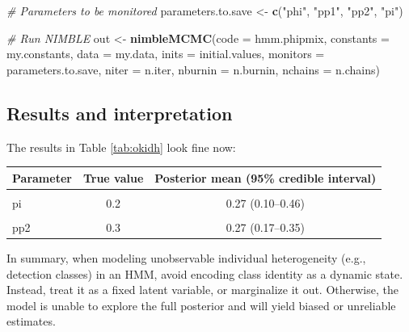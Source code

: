 \documentclass[
  12pt,
]{krantz}
\newenvironment{Shaded}{\begin{snugshade}}{\end{snugshade}}
\newcommand{\AttributeTok}[1]{\textcolor[rgb]{0.13,0.29,0.53}{#1}}
\newcommand{\CommentTok}[1]{\textcolor[rgb]{0.56,0.35,0.01}{\textit{#1}}}
\newcommand{\FunctionTok}[1]{\textcolor[rgb]{0.13,0.29,0.53}{\textbf{#1}}}
\newcommand{\NormalTok}[1]{#1}
\newcommand{\OtherTok}[1]{\textcolor[rgb]{0.56,0.35,0.01}{#1}}
\newcommand{\StringTok}[1]{\textcolor[rgb]{0.31,0.60,0.02}{#1}}
\begin{document}
\begin{Shaded}
\begin{Highlighting}[]
\CommentTok{\# Parameters to be monitored}
\NormalTok{parameters.to.save }\OtherTok{\textless{}{-}} \FunctionTok{c}\NormalTok{(}\StringTok{"phi"}\NormalTok{, }\StringTok{"pp1"}\NormalTok{, }\StringTok{"pp2"}\NormalTok{, }\StringTok{"pi"}\NormalTok{)}

\CommentTok{\# Run NIMBLE}
\NormalTok{out }\OtherTok{\textless{}{-}} \FunctionTok{nimbleMCMC}\NormalTok{(}\AttributeTok{code =}\NormalTok{ hmm.phipmix, }
                  \AttributeTok{constants =}\NormalTok{ my.constants,}
                  \AttributeTok{data =}\NormalTok{ my.data,              }
                  \AttributeTok{inits =}\NormalTok{ initial.values,}
                  \AttributeTok{monitors =}\NormalTok{ parameters.to.save,}
                  \AttributeTok{niter =}\NormalTok{ n.iter,}
                  \AttributeTok{nburnin =}\NormalTok{ n.burnin, }
                  \AttributeTok{nchains =}\NormalTok{ n.chains)}
\end{Highlighting}
\end{Shaded}

\subsection{Results and interpretation}\label{results-and-interpretation-5}

The results in Table \ref{tab:okidh} look fine now:

\begin{table}
\centering
\caption{\label{tab:okidh}Posterior estimates vs. data-generating values for a finite--mixture HMM, when a marginalized likelihood is used.}
\centering
\begin{longtable}{lcc}
\toprule
Parameter & True value & Posterior mean (95\% credible interval)\\
\midrule
\cellcolor{gray!10}{phi} & \cellcolor{gray!10}{0.7} & \cellcolor{gray!10}{0.72 (0.69–0.75)}\\
pi & 0.2 & 0.27 (0.10–0.46)\\
\cellcolor{gray!10}{pp1} & \cellcolor{gray!10}{0.8} & \cellcolor{gray!10}{0.79 (0.65–0.93)}\\
pp2 & 0.3 & 0.27 (0.17–0.35)\\
\bottomrule
\end{longtable}
\end{table}

\justifying

In summary, when modeling unobservable individual heterogeneity (e.g., detection classes) in an HMM, avoid encoding class identity as a dynamic state. Instead, treat it as a fixed latent variable, or marginalize it out. Otherwise, the model is unable to explore the full posterior and will yield biased or unreliable estimates.
\end{document}
